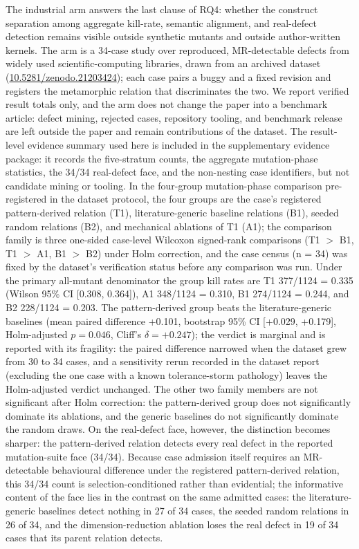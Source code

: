 \documentclass[manuscript,screen,review]{acmart}
\begin{document}
The industrial arm answers the last clause of RQ4: whether the
construct separation among aggregate kill-rate, semantic alignment, and
real-defect detection remains visible outside synthetic mutants and
outside author-written kernels. The arm is a 34-case study over
reproduced, MR-detectable defects from widely used scientific-computing
libraries, drawn from an archived dataset
\citep{defect4mr2026}
(\href{https://doi.org/10.5281/zenodo.21203424}{10.5281/zenodo.21203424});
each case pairs a buggy and a fixed revision and registers the
metamorphic relation that discriminates the two. We report verified
result totals only, and the arm does not change the
paper into a benchmark article:
defect mining, rejected cases, repository tooling, and benchmark release
are left outside the paper and remain contributions of the dataset. The result-level evidence summary used here is included
in the supplementary evidence package: it records the five-stratum counts,
the aggregate mutation-phase statistics, the 34/34 real-defect face, and
the non-nesting case identifiers, but not candidate mining or tooling. In
the four-group mutation-phase comparison pre-registered in the dataset
protocol, the four groups are the case's registered pattern-derived
relation (T1), literature-generic baseline relations (B1), seeded
random relations (B2), and mechanical ablations of T1 (A1); the
comparison family is three one-sided case-level Wilcoxon signed-rank
comparisons (T1 $>$ B1, T1 $>$ A1, B1 $>$ B2) under Holm correction,
and the case census (n = 34) was fixed by the dataset's verification
status before any comparison was run. Under the primary all-mutant
denominator the group kill rates are T1 377/1124 = 0.335 (Wilson 95\%
CI {[}0.308, 0.364{]}), A1 348/1124 = 0.310, B1 274/1124 = 0.244, and
B2 228/1124 = 0.203. The pattern-derived group beats the
literature-generic baselines (mean paired difference +0.101, bootstrap
95\% CI {[}+0.029, +0.179{]}, Holm-adjusted \(p=0.046\), Cliff's
\(\delta=+0.247\)); the verdict is marginal and is reported with its
fragility: the paired difference narrowed when the dataset grew from 30
to 34 cases, and a sensitivity rerun recorded in the dataset report
(excluding the one case with a known tolerance-storm pathology) leaves
the Holm-adjusted verdict unchanged. The other two family members are
not significant after Holm correction: the pattern-derived group does
not significantly dominate its ablations, and the generic baselines do
not significantly dominate the random draws. On the real-defect face, however, the distinction becomes
sharper: the pattern-derived relation detects every real defect in the
reported mutation-suite face (34/34). Because case admission itself
requires an MR-detectable behavioural difference under the registered
pattern-derived relation, this 34/34 count is selection-conditioned
rather than evidential; the informative content of the face lies in the
contrast on the same admitted cases: the literature-generic baselines
detect nothing in 27 of 34 cases, the seeded random relations in 26 of
34, and the dimension-reduction ablation loses the real defect in 19 of
34 cases that its parent relation detects.
\end{document}
